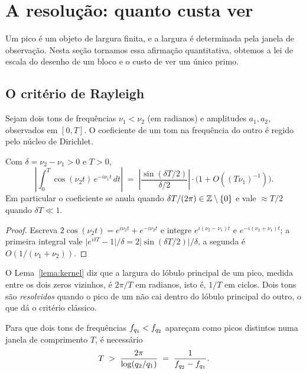\section{A resolução: quanto custa ver}\label{sec:resolucao}

Um pico é um objeto de largura finita, e a largura é determinada pela janela de
observação. Nesta seção tornamos essa afirmação quantitativa, obtemos a lei de
escala do desenho de um bloco e o custo de ver um único primo.

\subsection{O critério de Rayleigh}

Sejam dois tons de frequências $\nu_1<\nu_2$ (em radianos) e amplitudes $a_1,a_2$,
observados em $[0,T]$. O coeficiente de um tom na frequência do outro é regido
pelo núcleo de Dirichlet.

\begin{lema}\label{lema:kernel}
Com $\delta=\nu_2-\nu_1>0$ e $T>0$,
\[
  \left|\int_0^T\cos(\nu_2 t)\,e^{-i\nu_1 t}\,dt\right|
  \;=\;
  \left|\frac{\sin(\delta T/2)}{\delta/2}\right|\cdot\bigl(1+O((T\nu_1)^{-1})\bigr).
\]
Em particular o coeficiente se anula quando $\delta T/(2\pi)\in\mathbb{Z}\setminus\{0\}$ e
vale $\approx T/2$ quando $\delta T\ll1$.
\end{lema}

\begin{proof}
Escreva $2\cos(\nu_2t)=e^{i\nu_2t}+e^{-i\nu_2t}$ e integre $e^{i(\nu_2-\nu_1)t}$ e
$e^{-i(\nu_2+\nu_1)t}$; a primeira integral vale
$\bigl|e^{i\delta T}-1\bigr|/\delta=2|\sin(\delta T/2)|/\delta$, a segunda é
$O(1/(\nu_1+\nu_2))$.
\end{proof}

O Lema~\ref{lema:kernel} diz que a largura do lóbulo principal de um pico, medida
entre os dois zeros vizinhos, é $2\pi/T$ em radianos, isto é, $1/T$ em ciclos.
Dois tons são \emph{resolvidos} quando o pico de um não cai dentro do lóbulo
principal do outro, o que dá o critério clássico.

\begin{lema}[Rayleigh]\label{lema:rayleigh}
Para que dois tons de frequências $f_{q_1}<f_{q_2}$ apareçam como picos
distintos numa janela de comprimento $T$, é necessário
\[
  T \;>\; \frac{2\pi}{\log(q_2/q_1)} \;=\; \frac{1}{f_{q_2}-f_{q_1}} .
\]
\end{lema}

